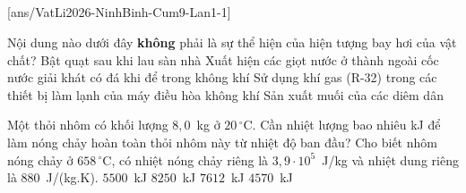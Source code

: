\def\CheDo{solcolor}%
\def\tenchuong{Cụm trường số 9, Ninh Bình -- Lần 1}
\def\thuonghieu{VẬT LÍ 12 -- Eduzy.com.vn}
\def\TachCauDS{1}
\def\TachCauLG{1}


\newcommand{\VLmaymua}[2]{%
	\begin{scope}[shift={(#1,#2)}]
		\shade[top color=VLxanh!45,bottom color=VLxanh!85!black] (-0.42,0) arc[start angle=270,end angle=90,radius=0.16] arc[start angle=160,end angle=60,radius=0.22] arc[start angle=110,end angle=0,radius=0.26] arc[start angle=80,end angle=-90,radius=0.18]--cycle;
		\foreach \VLx in {-0.24,0,0.24}{\draw[VLxanh!85!black,line width=0.9pt] (\VLx,-0.1)--++(-0.05,-0.15);}
	\end{scope}}


	\noindent
	\subsection*{}
	\setcounter{ex}{0}
	[ans/VatLi2026-NinhBinh-Cum9-Lan1-1]

	\begin{ex}%
		Nội dung nào dưới đây \textbf{không} phải là sự thể hiện của hiện tượng bay hơi của vật chất?
		\choice
		{Bật quạt sau khi lau sàn nhà}
		{\True Xuất hiện các giọt nước ở thành ngoài cốc nước giải khát có đá khi để trong không khí}
		{Sử dụng khí gas (R-32) trong các thiết bị làm lạnh của máy điều hòa không khí}
		{Sản xuất muối của các diêm dân}
	\end{ex}

	\begin{ex}%
		Một thỏi nhôm có khối lượng $8{,}0$~kg ở $20\,^\circ\text{C}$. Cần nhiệt lượng bao nhiêu kJ để làm nóng chảy hoàn toàn thỏi nhôm này từ nhiệt độ ban đầu? Cho biết nhôm nóng chảy ở $658\,^\circ\text{C}$, có nhiệt nóng chảy riêng là $3{,}9\cdot 10^5$~J/kg và nhiệt dung riêng là $880$~J/(kg.K).
		\choice
		{$5500$~kJ}
		{$8250$~kJ}
		{\True $7612$~kJ}
		{$4570$~kJ}
	\end{ex}

